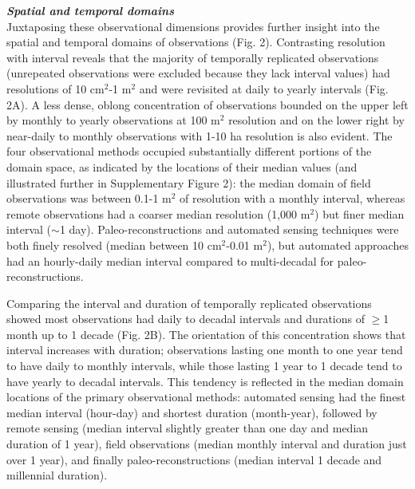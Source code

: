 \documentclass[12pt]{article}
\begin{document}
\vspace{5pt}
\noindent \textbf{\emph{Spatial and temporal domains}}\\
Juxtaposing these observational dimensions provides further insight into the spatial and temporal domains of observations (Fig. 2). Contrasting resolution with interval reveals that the majority of temporally replicated observations (unrepeated observations were excluded because they lack interval values) had resolutions of 10 cm$^2$-1 m$^2$ and were revisited at daily to yearly intervals (Fig. 2A). A less dense, oblong concentration of observations bounded on the upper left by monthly to yearly observations at 100 m$^2$ resolution and on the lower right by near-daily to monthly observations with 1-10 ha resolution is also evident. The four observational methods occupied substantially different portions of the domain space, as indicated by the locations of their median values (and illustrated further in Supplementary Figure 2): the median domain of field observations was between 0.1-1 m$^2$ of resolution with a monthly interval, whereas remote observations had a coarser median resolution (1,000 m$^2$) but finer median interval ($\sim$1 day). Paleo-reconstructions and automated sensing techniques were both finely resolved (median between 10 cm$^2$-0.01 m$^2$), but automated approaches had an hourly-daily median interval compared to multi-decadal for paleo-reconstructions. 

Comparing the interval and duration of temporally replicated observations showed most observations had daily to decadal intervals and durations of $\geq$1 month up to 1 decade (Fig. 2B). The orientation of this concentration shows that interval increases with duration; observations lasting one month to one year tend to have daily to monthly intervals, while those lasting 1 year to 1 decade tend to have yearly to decadal intervals. This tendency is reflected in the median domain locations of the primary observational methods: automated sensing had the finest median interval (hour-day) and shortest duration (month-year), followed by remote sensing (median interval slightly greater than one day and median duration of 1 year), field observations (median monthly interval and duration just over 1 year), and finally paleo-reconstructions (median interval 1 decade and millennial duration). 
\end{document}
